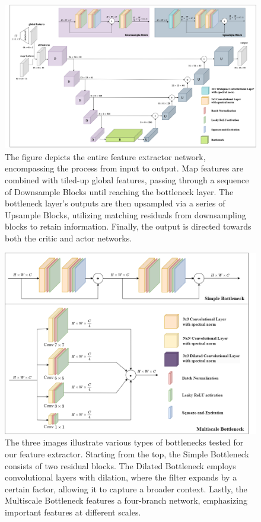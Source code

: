 \begin{figure}[htbp]
    \centering
    \includegraphics[width=0.9\linewidth]{images/methods_mono/feature_extractor/unet.png}
    \captionsetup{justification=justified, singlelinecheck=false, width=1\linewidth, labelfont=bf} 
    \caption[]{The figure depicts the entire feature extractor network, encompassing the process from input to output. Map features are combined with tiled-up global features, passing through a sequence of Downsample Blocks until reaching the bottleneck layer. The bottleneck layer's outputs are then upsampled via a series of Upsample Blocks, utilizing matching residuals from downsampling blocks to retain information. Finally, the output is directed towards both the critic and actor networks.}
    \label{fig:BottleNet}
\end{figure}

\begin{figure}[htbp]
    \centering
    \includegraphics[width=0.8\linewidth]{images/methods_mono/bottleneck/bottleneck.png}
    \captionsetup{justification=justified, singlelinecheck=false, width=1\linewidth, labelfont=bf} 
    \caption[]{The three images illustrate various types of bottlenecks tested for our feature extractor. Starting from the top, the Simple Bottleneck consists of two residual blocks. The Dilated Bottleneck employs convolutional layers with dilation, where the filter expands by a certain factor, allowing it to capture a broader context. Lastly, the Multiscale Bottleneck features a four-branch network, emphasizing important features at different scales.}
    \label{fig:Bottlenecks}
\end{figure}


